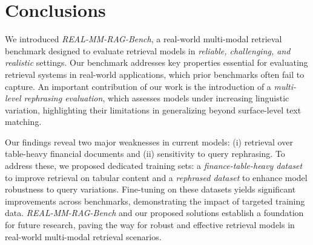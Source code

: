 \section{Conclusions}
\label{sec:conclusions}

We introduced \emph{REAL-MM-RAG-Bench}, a real-world multi-modal retrieval benchmark designed to evaluate retrieval models in \emph{reliable, challenging, and realistic} settings. Our benchmark addresses key properties essential for evaluating retrieval systems in real-world applications, which prior benchmarks often fail to capture. An important contribution of our work is the introduction of a \emph{multi-level rephrasing evaluation}, which assesses models under increasing linguistic variation, highlighting their limitations in generalizing beyond surface-level text matching.

\vspace{0.1cm}
\noindent
Our findings reveal two major weaknesses in current models: (i) retrieval over table-heavy financial documents and (ii) sensitivity to query rephrasing. To address these, we proposed dedicated training sets: a \emph{finance-table-heavy dataset} to improve retrieval on tabular content and a \emph{rephrased dataset} to enhance model robustness to query variations. Fine-tuning on these datasets yields significant improvements across benchmarks, demonstrating the impact of targeted training data. \emph{REAL-MM-RAG-Bench} and our proposed solutions establish a foundation for future research, paving the way for robust and effective retrieval models in real-world multi-modal retrieval scenarios.
